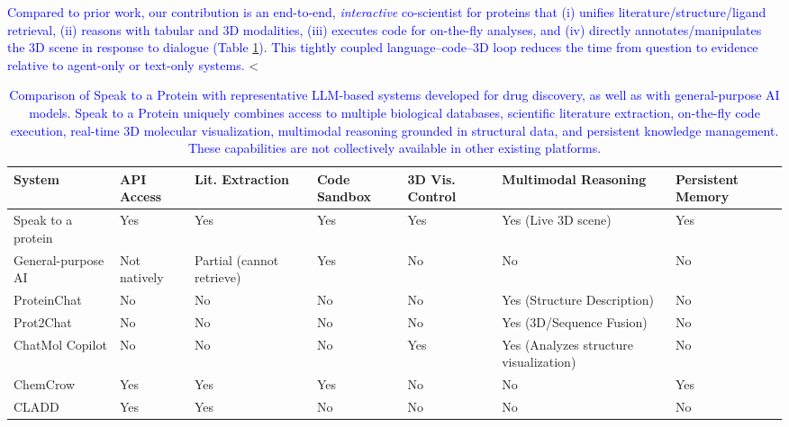 \documentclass{article}
\newcommand{\new}[1]{\textcolor{blue}{#1}}
\newcommand{\newtable}{\color{blue}}
\newcommand{\new}[1]{#1}
\newcommand{\newtable}{}
\begin{document}
\new{Compared to prior work, our contribution is an end-to-end, \emph{interactive} co-scientist for proteins that (i) unifies literature/structure/ligand retrieval, (ii) reasons with tabular and 3D modalities, (iii) executes code for on-the-fly analyses, and (iv) directly annotates/manipulates the 3D scene in response to dialogue \new{(Table \ref{tab:system_comparison})}. This tightly coupled language–code–3D loop reduces the time from question to evidence relative to agent-only or text-only systems.}
<
\begingroup
\renewcommand{\arraystretch}{1.3}
\begin{table}[h]
\centering
\caption{\new{Comparison of Speak to a Protein with representative LLM-based systems developed for drug discovery, as well as with general-purpose AI models. Speak to a Protein uniquely combines access to multiple biological databases, scientific literature extraction, on-the-fly code execution, real-time 3D molecular visualization, multimodal reasoning grounded in structural data, and  persistent knowledge management. These capabilities are not collectively available in other existing platforms.}}
\newtable
\label{tab:system_comparison}
\begin{tabularx}{\textwidth}{
    >{\raggedright\arraybackslash}X
    >{\raggedright\arraybackslash}X
    >{\raggedright\arraybackslash}X
    >{\raggedright\arraybackslash}X
    >{\raggedright\arraybackslash}X
    >{\raggedright\arraybackslash}X
    >{\raggedright\arraybackslash}X
}
\toprule
\textbf{System} & \textbf{API Access} & \textbf{Lit. Extraction} & \textbf{Code Sandbox} & \textbf{3D Vis. Control} & \textbf{Multimodal Reasoning} & \textbf{Persistent Memory} \\
\midrule
Speak to a protein & Yes & Yes & Yes & Yes & Yes (Live 3D scene) & Yes \\
General-purpose AI & Not natively & Partial (cannot retrieve) & Yes & No & No & No \\
ProteinChat & No & No & No & No & Yes (Structure Description) & No \\
Prot2Chat & No & No & No & No & Yes (3D/Sequence Fusion) & No \\
ChatMol Copilot & No & No & No & Yes & Yes (Analyzes structure visualization) & No \\
ChemCrow & Yes & Yes & Yes & No & No & Yes \\
CLADD & Yes & Yes & No & No & No & No \\
\bottomrule
\end{tabularx}
\end{table}
\endgroup
\end{document}
